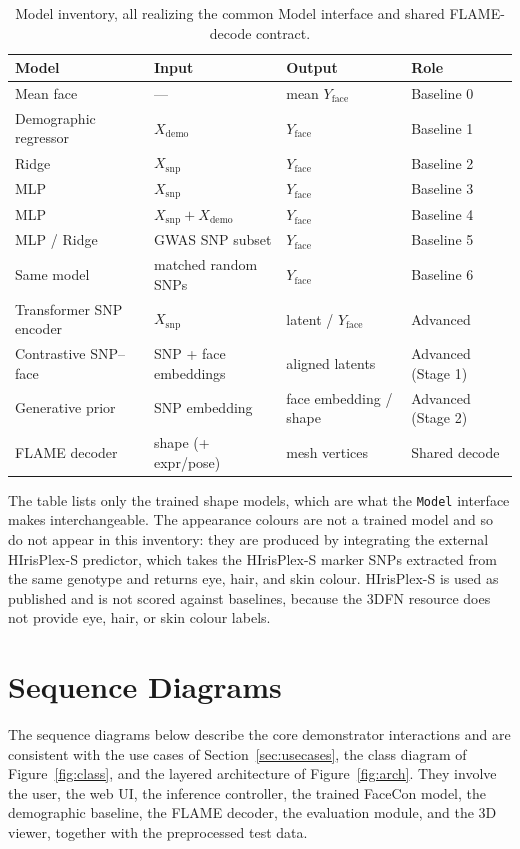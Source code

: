 \begin{table}[!ht]
\centering
\caption{Model inventory, all realizing the common Model interface and shared FLAME-decode contract.}
\label{tab:models}
\small
\begin{tabular}{|P{3.6cm}|P{3.2cm}|P{2.4cm}|P{3.0cm}|}
\hline
\textbf{Model} & \textbf{Input} & \textbf{Output} & \textbf{Role} \\ \hline
Mean face & --- & mean $Y_{\mathrm{face}}$ & Baseline 0 \\ \hline
Demographic regressor & $X_{\mathrm{demo}}$ & $Y_{\mathrm{face}}$ & Baseline 1 \\ \hline
Ridge & $X_{\mathrm{snp}}$ & $Y_{\mathrm{face}}$ & Baseline 2 \\ \hline
MLP & $X_{\mathrm{snp}}$ & $Y_{\mathrm{face}}$ & Baseline 3 \\ \hline
MLP & $X_{\mathrm{snp}} + X_{\mathrm{demo}}$ & $Y_{\mathrm{face}}$ & Baseline 4 \\ \hline
MLP / Ridge & GWAS SNP subset & $Y_{\mathrm{face}}$ & Baseline 5 \\ \hline
Same model & matched random SNPs & $Y_{\mathrm{face}}$ & Baseline 6 \\ \hline
Transformer SNP encoder & $X_{\mathrm{snp}}$ & latent / $Y_{\mathrm{face}}$ & Advanced \\ \hline
Contrastive SNP--face & SNP + face embeddings & aligned latents & Advanced (Stage 1) \\ \hline
Generative prior & SNP embedding & face embedding / shape & Advanced (Stage 2) \\ \hline
FLAME decoder & shape (+ expr/pose) & mesh vertices & Shared decode \\ \hline
\end{tabular}
\end{table}

The table lists only the trained shape models, which are what the \texttt{Model} interface makes interchangeable. The appearance colours are not a trained model and so do not appear in this inventory: they are produced by integrating the external HIrisPlex-S predictor, which takes the HIrisPlex-S marker SNPs extracted from the same genotype and returns eye, hair, and skin colour. HIrisPlex-S is used as published and is not scored against baselines, because the 3DFN resource does not provide eye, hair, or skin colour labels.

\section{Sequence Diagrams}
\label{sec:seq}
The sequence diagrams below describe the core demonstrator interactions and are consistent with the use cases of Section~\ref{sec:usecases}, the class diagram of Figure~\ref{fig:class}, and the layered architecture of Figure~\ref{fig:arch}. They involve the user, the web UI, the inference controller, the trained FaceCon model, the demographic baseline, the FLAME decoder, the evaluation module, and the 3D viewer, together with the preprocessed test data.

